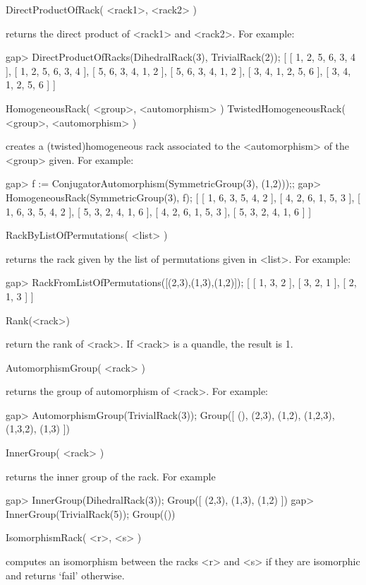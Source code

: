\>DirectProductOfRack( <rack1>, <rack2> )

returns the direct product of <rack1> and <rack2>.
For example:

\beginexample
gap> DirectProductOfRacks(DihedralRack(3), TrivialRack(2));
[ [  1,  2,  5,  6,  3,  4 ],
  [  1,  2,  5,  6,  3,  4 ],
  [  5,  6,  3,  4,  1,  2 ],
  [  5,  6,  3,  4,  1,  2 ],
  [  3,  4,  1,  2,  5,  6 ],
  [  3,  4,  1,  2,  5,  6 ] ]
\endexample

\>HomogeneousRack( <group>, <automorphism> )
\>TwistedHomogeneousRack( <group>, <automorphism> )

creates a (twisted)homogeneous rack associated to the <automorphism> 
of the <group> given. For example:

\beginexample
gap> f := ConjugatorAutomorphism(SymmetricGroup(3), (1,2)));;
gap> HomogeneousRack(SymmetricGroup(3), f);
[ [  1,  6,  3,  5,  4,  2 ],
  [  4,  2,  6,  1,  5,  3 ],
  [  1,  6,  3,  5,  4,  2 ],
  [  5,  3,  2,  4,  1,  6 ],
  [  4,  2,  6,  1,  5,  3 ],
  [  5,  3,  2,  4,  1,  6 ] ]
\endexample

\>RackByListOfPermutations( <list> )

returns the rack given by the list of permutations given in <list>. For example:

\beginexample
gap> RackFromListOfPermutations([(2,3),(1,3),(1,2)]);                                         
[ [  1,  3,  2 ],
  [  3,  2,  1 ],
  [  2,  1,  3 ] ]
\endexample

\>Rank(<rack>)

return the rank of <rack>. If <rack> is a quandle, the result is 1.

\>AutomorphismGroup( <rack> )

returns the group of automorphism of <rack>. For example:

\beginexample
gap> AutomorphismGroup(TrivialRack(3));                  
Group([ (), (2,3), (1,2), (1,2,3), (1,3,2), (1,3) ])
\endexample

\>InnerGroup( <rack> )

returns the inner group of the rack. For example

\beginexample
gap> InnerGroup(DihedralRack(3));
Group([ (2,3), (1,3), (1,2) ])
gap> InnerGroup(TrivialRack(5)); 
Group(())
\endexample

\>IsomorphismRack( <r>, <s> )

computes  an  isomorphism  between  the  racks  <r>  and  <s> if they are
isomorphic and returns `fail' otherwise.

